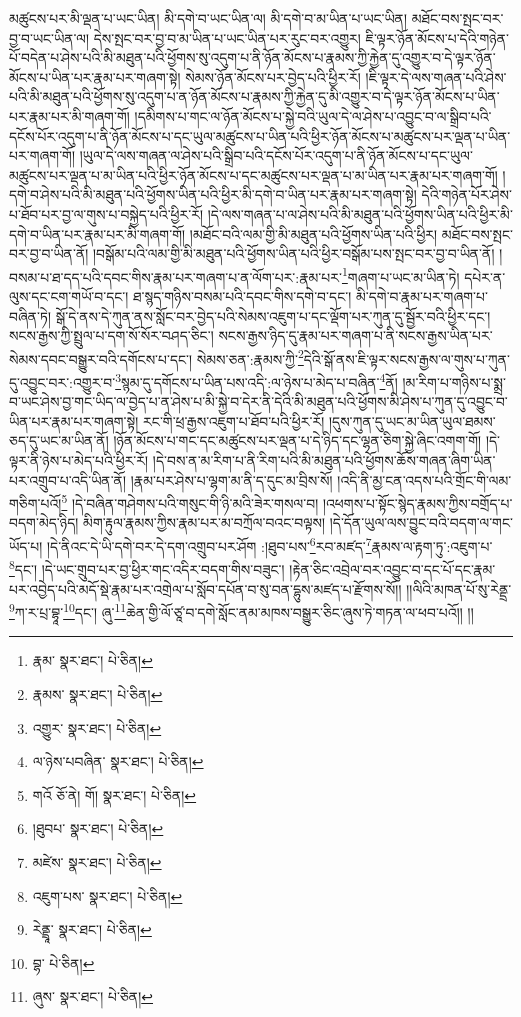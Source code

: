 མཚུངས་པར་མི་ལྡན་པ་ཡང་ཡིན། མི་དགེ་བ་ཡང་ཡིན་ལ། མི་དགེ་བ་མ་ཡིན་པ་ཡང་ཡིན། མཐོང་བས་སྤང་བར་བྱ་བ་ཡང་ཡིན་ལ། དེས་སྤང་བར་བྱ་བ་མ་ཡིན་པ་ཡང་ཡིན་པར་རུང་བར་འགྱུར། ཇི་ལྟར་ཉོན་མོངས་པ་དེའི་གཉེན་པོ་བདེན་པ་ཤེས་པའི་མི་མཐུན་པའི་ཕྱོགས་སུ་འདུག་པ་ནི་ཉོན་མོངས་པ་རྣམས་ཀྱི་རྐྱེན་དུ་འགྱུར་བ་དེ་ལྟར་ཉོན་མོངས་པ་ཡིན་པར་རྣམ་པར་གཞག་སྟེ། སེམས་ཉོན་མོངས་པར་བྱེད་པའི་ཕྱིར་རོ། །ཇི་ལྟར་དེ་ལས་གཞན་པའི་ཤེས་པའི་མི་མཐུན་པའི་ཕྱོགས་སུ་འདུག་པ་ན་ཉོན་མོངས་པ་རྣམས་ཀྱི་རྐྱེན་དུ་མི་འགྱུར་བ་དེ་ལྟར་ཉོན་མོངས་པ་ཡིན་པར་རྣམ་པར་མི་གཞག་གོ། །དམིགས་པ་གང་ལ་ཉོན་མོངས་པ་སྐྱེ་བའི་ཡུལ་དེ་ལ་ཤེས་པ་འབྱུང་བ་ལ་སྒྲིབ་པའི་དངོས་པོར་འདུག་པ་ནི་ཉོན་མོངས་པ་དང་ཡུལ་མཚུངས་པ་ཡིན་པའི་ཕྱིར་ཉོན་མོངས་པ་མཚུངས་པར་ལྡན་པ་ཡིན་པར་གཞག་གོ། །ཡུལ་དེ་ལས་གཞན་ལ་ཤེས་པའི་སྒྲིབ་པའི་དངོས་པོར་འདུག་པ་ནི་ཉོན་མོངས་པ་དང་ཡུལ་མཚུངས་པར་ལྡན་པ་མ་ཡིན་པའི་ཕྱིར་ཉོན་མོངས་པ་དང་མཚུངས་པར་ལྡན་པ་མ་ཡིན་པར་རྣམ་པར་གཞག་གོ། །དགེ་བ་ཤེས་པའི་མི་མཐུན་པའི་ཕྱོགས་ཡིན་པའི་ཕྱིར་མི་དགེ་བ་ཡིན་པར་རྣམ་པར་གཞག་སྟེ། དེའི་གཉེན་པོར་ཤེས་པ་ཐོབ་པར་བྱ་ལ་གུས་པ་བསྐྱེད་པའི་ཕྱིར་རོ། །དེ་ལས་གཞན་པ་ལ་ཤེས་པའི་མི་མཐུན་པའི་ཕྱོགས་ཡིན་པའི་ཕྱིར་མི་དགེ་བ་ཡིན་པར་རྣམ་པར་མི་གཞག་གོ། །མཐོང་བའི་ལམ་གྱི་མི་མཐུན་པའི་ཕྱོགས་ཡིན་པའི་ཕྱིར། མཐོང་བས་སྤང་བར་བྱ་བ་ཡིན་ནོ། །བསྒོམ་པའི་ལམ་གྱི་མི་མཐུན་པའི་ཕྱོགས་ཡིན་པའི་ཕྱིར་བསྒོམ་པས་སྤང་བར་བྱ་བ་ཡིན་ནོ། །བསམ་པ་ཐ་དད་པའི་དབང་གིས་རྣམ་པར་གཞག་པ་ན་ལོག་པར་:རྣམ་པར་\footnote{རྣམ་  སྣར་ཐང་།  པེ་ཅིན། }གཞག་པ་ཡང་མ་ཡིན་ཏེ། དཔེར་ན་ལུས་དང་ངག་གཡོ་བ་དང་། ཐ་སྙད་གཉིས་བསམ་པའི་དབང་གིས་དགེ་བ་དང་། མི་དགེ་བ་རྣམ་པར་གཞག་པ་བཞིན་ཏེ། སྒོ་དེ་ནས་དེ་ཀུན་ནས་སློང་བར་བྱེད་པའི་སེམས་འཇུག་པ་དང་ལྡོག་པར་ཀུན་དུ་སྦྱོར་བའི་ཕྱིར་དང་། སངས་རྒྱས་ཀྱི་སྤྲུལ་པ་དག་སོ་སོར་བཤད་ཅིང་། སངས་རྒྱས་ཉིད་དུ་རྣམ་པར་གཞག་པ་ནི་སངས་རྒྱས་ཡིན་པར་སེམས་དབང་བསྒྱུར་བའི་དགོངས་པ་དང་། སེམས་ཅན་:རྣམས་ཀྱི་\footnote{རྣམས་  སྣར་ཐང་།  པེ་ཅིན། }དེའི་སྒོ་ནས་ཇི་ལྟར་སངས་རྒྱས་ལ་གུས་པ་ཀུན་དུ་འབྱུང་བར་:འགྱུར་བ་\footnote{འགྱུར་  སྣར་ཐང་།  པེ་ཅིན། }སྙམ་དུ་དགོངས་པ་ཡིན་པས་འདི་:ལ་ཉེས་པ་མེད་པ་བཞིན་\footnote{ལ་ཉེས་པབཞིན་  སྣར་ཐང་།  པེ་ཅིན། }ནོ། །མ་རིག་པ་གཉིས་པ་སྨྲ་བ་ཡང་ཤེས་བྱ་གང་ཡིད་ལ་བྱེད་པ་ན་ཤེས་པ་མི་སྐྱེ་བ་དེར་ནི་དེའི་མི་མཐུན་པའི་ཕྱོགས་མི་ཤེས་པ་ཀུན་དུ་འབྱུང་བ་ཡིན་པར་རྣམ་པར་གཞག་སྟེ། རང་གི་ཕྲ་རྒྱས་འཇུག་པ་ཐོབ་པའི་ཕྱིར་རོ། །དུས་ཀུན་དུ་ཡང་མ་ཡིན་ཡུལ་ཐམས་ཅད་དུ་ཡང་མ་ཡིན་ནོ། །ཉོན་མོངས་པ་གང་དང་མཚུངས་པར་ལྡན་པ་དེ་ཉིད་དང་ལྷན་ཅིག་སྐྱེ་ཞིང་འགག་གོ། །དེ་ལྟར་ནི་ཉེས་པ་མེད་པའི་ཕྱིར་རོ། །དེ་བས་ན་མ་རིག་པ་ནི་རིག་པའི་མི་མཐུན་པའི་ཕྱོགས་ཆོས་གཞན་ཞིག་ཡིན་པར་འགྲུབ་པ་འདི་ཡིན་ནོ། །རྣམ་པར་ཤེས་པ་ལྷག་མ་ནི་ད་དུང་མ་བྲིས་སོ། །འདི་ནི་མྱ་ངན་འདས་པའི་གྲོང་གི་ལམ་གཅིག་པའོ།\footnote{གའོ  ཅོ་ནེ། གོ།  སྣར་ཐང་།  པེ་ཅིན། } །དེ་བཞིན་གཤེགས་པའི་གསུང་གི་ཉི་མའི་ཟེར་གསལ་བ། །འཕགས་པ་སྟོང་སྙེད་རྣམས་ཀྱིས་བགྲོད་པ་བདག་མེད་ཉིད། མིག་རྟུལ་རྣམས་ཀྱིས་རྣམ་པར་མ་བཀྲོལ་བའང་བལྟས། །དེ་དོན་ཡུལ་ལས་བྱུང་བའི་བདག་ལ་གང་ཡོད་པ། །དེ་ནིའང་དེ་ཡི་དགེ་བར་དེ་དག་འགྲུབ་པར་ཤོག :།ཐུབ་པས་\footnote{།ཐུབཔ་  སྣར་ཐང་།  པེ་ཅིན། }རབ་མཛད་\footnote{མཛེས་  སྣར་ཐང་།  པེ་ཅིན། }རྣམས་ལ་རྟག་ཏུ་:འཇུག་པ་\footnote{འཇུག་པས་  སྣར་ཐང་།  པེ་ཅིན། }དང་། །དེ་ཡང་གྲུབ་པར་བྱ་ཕྱིར་གང་འདིར་བདག་གིས་བཟུང་། །རྟེན་ཅིང་འབྲེལ་བར་འབྱུང་བ་དང་པོ་དང་རྣམ་པར་འབྱེད་པའི་མདོ་སྡེ་རྣམ་པར་འགྲེལ་པ་སློབ་དཔོན་བ་སུ་བན་དྷུས་མཛད་པ་རྫོགས་སོ།། །།ལིའི་མཁན་པོ་སུ་རེནྡྲ་\footnote{རེནྡྲཱ་  སྣར་ཐང་།  པེ་ཅིན། }ཀ་ར་པྲ་བྷཱ་\footnote{བྷ་  པེ་ཅིན། }དང་། ཞུ་\footnote{ཞུས་  སྣར་ཐང་།  པེ་ཅིན། }ཆེན་གྱི་ལོ་ཙཱ་བ་དགེ་སློང་ནམ་མཁས་བསྒྱུར་ཅིང་ཞུས་ཏེ་གཏན་ལ་ཕབ་པའོ།། །།